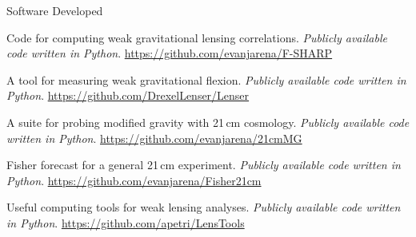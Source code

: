 \documentclass{resume} %
\begin{document}

\begin{rSection}{Software Developed}

\underline{}

\begin{description}[leftmargin=10em, style=nextline]

\item[\texttt{F-SHARP}] Code for computing weak gravitational lensing correlations. \textit{Publicly available code written in Python}. \href{https://github.com/evanjarena/F-SHARP}{https://github.com/evanjarena/F-SHARP}

\item[\texttt{Lenser}] A tool for measuring weak gravitational flexion. \textit{Publicly available code written in Python}. \href{https://github.com/DrexelLenser/Lenser}{https://github.com/DrexelLenser/Lenser}

\item[21cmMG] A suite for probing modified gravity with 21\,cm cosmology. \textit{Publicly available code written in Python}. \href{https://github.com/evanjarena/21cmMG}{https://github.com/evanjarena/21cmMG}

\item[Fisher21cm] Fisher forecast for a general 21\,cm experiment. \textit{Publicly available code written in Python}. \href{https://github.com/evanjarena/Fisher21cm}{https://github.com/evanjarena/Fisher21cm}

\end{description}

\underline{}

\begin{description}[leftmargin=10em, style=nextline]

\item[\texttt{LensTools}] Useful computing tools for weak lensing analyses. \textit{Publicly available code written in Python}. \href{https://github.com/apetri/LensTools}{https://github.com/apetri/LensTools}

\end{description}

\end{rSection}

\end{document}
